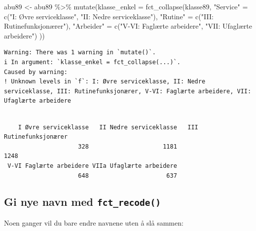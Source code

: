 \documentclass[
  norsk,
  letterpaper,
  DIV=11,
  numbers=noendperiod]{scrreprt}
\newenvironment{Shaded}{\begin{snugshade}}{\end{snugshade}}
\newcommand{\AttributeTok}[1]{\textcolor[rgb]{0.40,0.45,0.13}{#1}}
\newcommand{\FunctionTok}[1]{\textcolor[rgb]{0.28,0.35,0.67}{#1}}
\newcommand{\NormalTok}[1]{\textcolor[rgb]{0.00,0.23,0.31}{#1}}
\newcommand{\OtherTok}[1]{\textcolor[rgb]{0.00,0.23,0.31}{#1}}
\newcommand{\SpecialCharTok}[1]{\textcolor[rgb]{0.37,0.37,0.37}{#1}}
\newcommand{\StringTok}[1]{\textcolor[rgb]{0.13,0.47,0.30}{#1}}
\theoremstyle{definition}
\theoremstyle{remark}
\begin{document}
\begin{Shaded}
\begin{Highlighting}[]
\NormalTok{abu89 }\OtherTok{\textless{}{-}}\NormalTok{ abu89 }\SpecialCharTok{\%\textgreater{}\%}
  \FunctionTok{mutate}\NormalTok{(}\AttributeTok{klasse\_enkel =} \FunctionTok{fct\_collapse}\NormalTok{(klasse89,}
    \StringTok{"Service"} \OtherTok{=} \FunctionTok{c}\NormalTok{(}\StringTok{"I: Øvre serviceklasse"}\NormalTok{, }\StringTok{"II: Nedre serviceklasse"}\NormalTok{),}
    \StringTok{"Rutine"} \OtherTok{=} \FunctionTok{c}\NormalTok{(}\StringTok{"III: Rutinefunksjonærer"}\NormalTok{),}
    \StringTok{"Arbeider"} \OtherTok{=} \FunctionTok{c}\NormalTok{(}\StringTok{"V{-}VI: Faglærte arbeidere"}\NormalTok{, }\StringTok{"VII: Ufaglærte arbeidere"}\NormalTok{)}
\NormalTok{  ))}
\end{Highlighting}
\end{Shaded}

\begin{verbatim}
Warning: There was 1 warning in `mutate()`.
i In argument: `klasse_enkel = fct_collapse(...)`.
Caused by warning:
! Unknown levels in `f`: I: Øvre serviceklasse, II: Nedre serviceklasse, III: Rutinefunksjonærer, V-VI: Faglærte arbeidere, VII: Ufaglærte arbeidere
\end{verbatim}

\begin{Shaded}
\end{Shaded}

\begin{verbatim}

    I Øvre serviceklasse   II Nedre serviceklasse   III Rutinefunksjonærer 
                     328                     1181                     1248 
 V-VI Faglærte arbeidere VIIa Ufaglærte arbeidere 
                     648                      637 
\end{verbatim}

\subsection{\texorpdfstring{Gi nye navn med
\texttt{fct\_recode()}}{Gi nye navn med fct\_recode()}}\label{gi-nye-navn-med-fct_recode}

Noen ganger vil du bare endre navnene uten å slå sammen:
\end{document}
